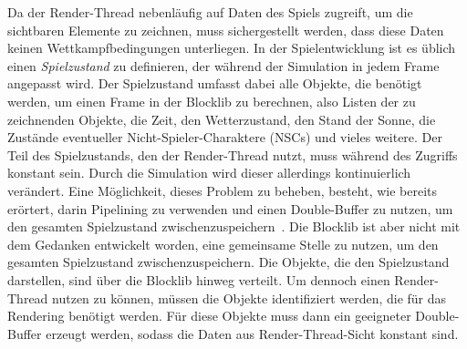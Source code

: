 Da der Render-Thread nebenläufig auf Daten des Spiels zugreift, um die sichtbaren Elemente zu zeichnen, muss sichergestellt werden, dass diese Daten keinen Wettkampfbedingungen unterliegen. In der Spielentwicklung ist es üblich einen \emph{Spielzustand} zu definieren, der während der Simulation in jedem Frame angepasst wird. Der Spielzustand umfasst dabei alle Objekte, die benötigt werden, um einen Frame in der Blocklib zu berechnen, also Listen der zu zeichnenden Objekte, die Zeit, den Wetterzustand, den Stand der Sonne, die Zustände eventueller Nicht-Spieler-Charaktere (NSCs) und vieles weitere. Der Teil des Spielzustands, den der Render-Thread nutzt, muss während des Zugriffs konstant sein. Durch die Simulation wird dieser allerdings kontinuierlich verändert. Eine Möglichkeit, dieses Problem zu beheben, besteht, wie bereits erörtert, darin Pipelining zu verwenden und einen Double-Buffer zu nutzen, um den gesamten Spielzustand zwischenzuspeichern~\cite{Tatarchuk2014}. Die Blocklib ist aber nicht mit dem Gedanken entwickelt worden, eine gemeinsame Stelle zu nutzen, um den gesamten Spielzustand zwischenzuspeichern. Die Objekte, die den Spielzustand darstellen, sind über die Blocklib hinweg verteilt. Um dennoch einen Render-Thread nutzen zu können, müssen die Objekte identifiziert werden, die für das Rendering benötigt werden. Für diese Objekte muss dann ein geeigneter Double-Buffer erzeugt werden, sodass die Daten aus Render-Thread-Sicht konstant sind.

